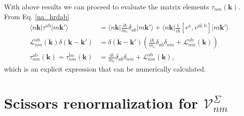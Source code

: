 With above results we can proceed to evaluate the matrix elements
$\tau_{nm}(\mathbf{k})$. From Eq. \eqref{na_hrdab}
\begin{align}\label{na_hrdabn}
\langle n\mathbf{k}\vert \tau^{\mathrm{a}\mathrm{b}} \vert m\mathbf{k}'\rangle
&=\langle n\mathbf{k}\vert\frac{i\hbar}{m_e}\delta_{ab}\vert m\mathbf{k}'\rangle
+ \langle n\mathbf{k}\vert 
\frac{1}{i\hbar}
\left[r^{\mathrm{a}},v^{\mathrm{nl},\mathrm{b}}\right]
\vert m\mathbf{k}'\rangle\nonumber\\
\mathcal{L}^{\mathrm{a}\mathrm{b}}_{nm}(\mathbf{k})
\delta(\mathbf{k}-\mathbf{k}')
&= \delta(\mathbf{k}-\mathbf{k}')
\left(
  \frac{i\hbar}{m_e}\delta_{ab}\delta_{nm}
+ \mathcal{L}_{nm}^{\mathrm{a}\mathrm{b}}(\mathbf{k})
\right)\nonumber\\
\tau^{\mathrm{a}\mathrm{b}}_{nm}(\mathbf{k})
 = \tau^{\mathrm{b}\mathrm{a}}_{nm}(\mathbf{k})
&= \frac{i\hbar}{m_e}\delta_{ab}\delta_{nm}
+ \mathcal{L}_{nm}^{\mathrm{a}\mathrm{b}}(\mathbf{k}),
\end{align}
which is an explicit expression that can be numerically calculated.



\section{Scissors renormalization for 
\texorpdfstring{$\boldsymbol{\mathcal{V}}^\Sigma_{nm}$}{Vnm}}
\label{app:voila}

